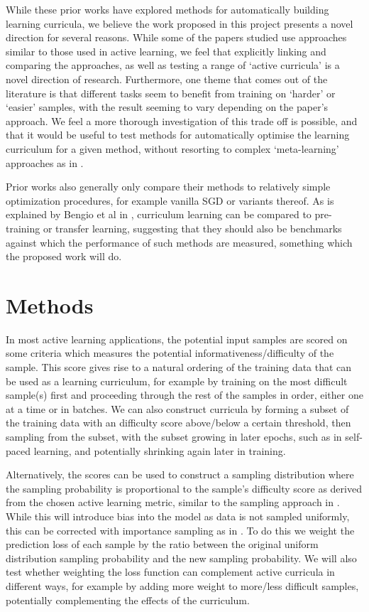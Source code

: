 \documentclass[a4paper,11pt]{article}
\begin{document}
While these prior works have explored methods for automatically building learning curricula, we believe the work proposed in this project presents a novel direction for several reasons. While some of the papers studied use approaches similar to those used in active learning, we feel that explicitly linking and comparing the approaches, as well as testing a range of `active curricula' is a novel direction of research. Furthermore, one theme that comes out of the literature is that different tasks seem to benefit from training on `harder' or `easier' samples, with the result seeming to vary depending on the paper's approach. We feel a more thorough investigation of this trade off is possible, and that it would be useful to test methods for automatically optimise the learning curriculum for a given method, without resorting to complex `meta-learning' approaches as in \cite{Fan 2017}.

Prior works also generally only compare their methods to relatively simple optimization procedures, for example vanilla SGD or variants thereof. As is explained by Bengio et al in \cite{Bengio 09}, curriculum learning can be compared to pre-training or transfer learning, suggesting that they should also be benchmarks against which the performance of such methods are measured, something which the proposed work will do. 

\section{Methods}
In most active learning applications, the potential input samples are scored on some criteria which measures the potential informativeness/difficulty of the sample. This score gives rise to a natural ordering of the training data that can be used as a learning curriculum, for example by training on the most difficult sample(s) first and proceeding through the rest of the samples in order, either one at a time or in batches. We can also construct curricula by forming a subset of the training data with an difficulty score above/below a certain threshold, then sampling from the subset, with the subset growing in later epochs, such as in self-paced learning, and potentially shrinking again later in training. 

Alternatively, the scores can be used to construct a sampling distribution where the sampling probability is proportional to the sample's difficulty score as derived from the chosen active learning metric, similar to the sampling approach in \cite{Chang 18}. While this will introduce bias into the model as data is not sampled uniformly, this can be corrected with importance sampling as in \cite{Katharopoulos 2018}. To do this we weight the prediction loss of each sample by the ratio between the original uniform distribution sampling probability and the new sampling probability. We will also test whether weighting the loss function can complement active curricula in different ways, for example by adding more weight to more/less difficult samples, potentially complementing the effects of the curriculum.
\end{document}
